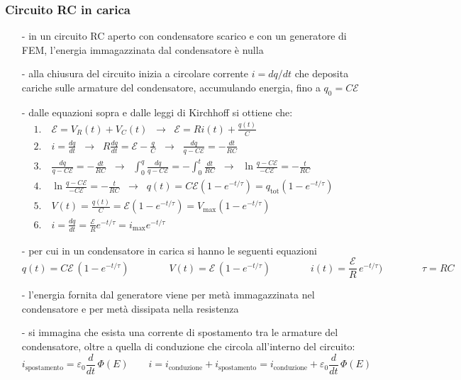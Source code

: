 \documentclass[a4paper]{article}
\newcommand\dt{\frac{d}{dt}\,}
\begin{document}
\subsubsection*{Circuito RC in carica}
\begin{itemize}[topsep=3pt, itemsep=0pt]
	\item[-] in un circuito RC aperto con condensatore scarico e con un generatore di FEM, l'energia immagazzinata dal
	condensatore è nulla
	\item[-] alla chiusura del circuito inizia a circolare corrente \(i = dq/dt\) che deposita cariche sulle armature del
	condensatore, accumulando energia, fino a \(q_0 = C \mathcal{E}\)
	\item[-] dalle equazioni sopra e dalle leggi di Kirchhoff si ottiene che:
	\begin{align*}
		&1. \quad \mathcal{E} = V_R(t) + V_C(t) \;\;\rightarrow\;\; \mathcal{E} = Ri(t) + \frac{q(t)}{C} \\
		&2. \quad i = \frac{dq}{dt} \;\;\rightarrow\;\; R \frac{dq}{dt} = \mathcal{E} -\frac{q}{C} \;\;\rightarrow\;\; \frac{dq}{q - C\mathcal{E}} = - \frac{dt}{RC} \\
		&3. \quad \frac{dq}{q - C\mathcal{E}} = - \frac{dt}{RC} \;\;\rightarrow\;\; \int_0^q \frac{dq}{q - C\mathcal{E}} = -\int_0^t \frac{dt}{RC} \;\;\rightarrow\;\; \ln \frac{q - C\mathcal{E}}{-C\mathcal{E}} = -\frac{t}{RC} \\
		&4. \quad \ln \frac{q - C\mathcal{E}}{-C\mathcal{E}} = -\frac{t}{RC}  \;\;\rightarrow\;\; q(t) = C \mathcal{E} (1-e^{-t/\tau}) = q_\text{tot} (1-e^{-t/\tau}) \\
		&5. \quad V(t) = \frac{q(t)}{C} = \mathcal{E} (1-e^{-t/\tau}) =  V_\text{max} (1-e^{-t/\tau}) \\
		&6. \quad i = \frac{dq}{dt} = \frac{\mathcal{E}}{R} e^{-t/\tau} = i_\text{max} e^{-t/\tau} \qquad\qquad\qquad\qquad\qquad\qquad\qquad\qquad\qquad\qquad\quad
	\end{align*}
	\item[-] per cui in un condensatore in carica si hanno le seguenti equazioni
	\[q(t) = C \mathcal{E} \, (1-e^{-t/\tau}) \qquad \qquad V(t) = \mathcal{E} \, (1-e^{-t/\tau}) \qquad \qquad i(t) = \frac{\mathcal{E}}{R} \, e^{-t/\tau}) \qquad \qquad \tau = RC\]
	\item[-] l'energia fornita dal generatore viene per metà immagazzinata nel condensatore e per metà dissipata nella resistenza
	\item[-] si immagina che esista una corrente di spostamento tra le armature del condensatore, oltre a quella di conduzione che
	circola all'interno del circuito:
	\[i_\text{spostamento} = \varepsilon_0 \dt \Phi(E) \qquad i = i_\text{conduzione} + i_\text{spostamento} = i_\text{conduzione} + \varepsilon_0 \dt \Phi(E)\]
\end{itemize}
\end{document}
